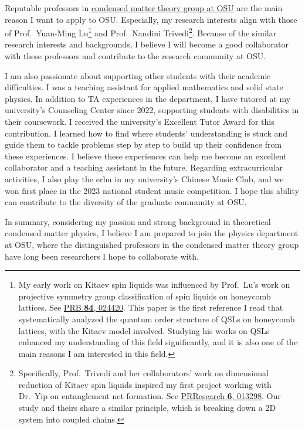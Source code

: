 Reputable professors in \href{https://physics.osu.edu/research/condensed-matter/condensed-matter-theory}{condensed matter theory group at OSU} are the main reason I want to apply to OSU. Especially, my research interests align with those of Prof.~Yuan-Ming Lu\footnote{My early work on Kitaev spin liquids was influenced by Prof.~Lu's work on projective symmetry group classification of spin liquids on honeycomb lattices. See \href{https://journals.aps.org/prb/abstract/10.1103/PhysRevB.84.024420}{PRB \textbf{84}, 024420}. This paper is the first reference I read that systematically analyzed the quantum order structure of QSLs on honeycomb lattices, with the Kitaev model involved. Studying his works on QSLs enhanced my understanding of this field significantly, and it is also one of the main reasons I am interested in this field.} and Prof.~Nandini Trivedi\footnote{Specifically, Prof.~Trivedi and her collaborators' work on dimensional reduction of Kitaev spin liquids inspired my first project working with Dr.~Yip on entanglement net formation. See \href{https://doi.org/10.1103/PhysRevResearch.6.013298}{PRResearch \textbf{6}, 013298}. Our study and theirs share a similar principle, which is breaking down a 2D system into coupled chains.}. Because of the similar research interests and backgrounds, I believe I will become a good collaborator with these professors and contribute to the research community at OSU.    

I am also passionate about supporting other students with their academic difficulties. I was a teaching assistant for applied mathematics and solid state physics. In addition to TA experiences in the department, I have tutored at my university's Counseling Center since 2022, supporting students with disabilities in their coursework. I received the university's Excellent Tutor Award for this contribution. I learned how to find where students' understanding is stuck and guide them to tackle problems step by step to build up their confidence from these experiences. I believe these experiences can help me become an excellent collaborator and a teaching assistant in the future. Regarding extracurricular activities, I also play the erhu in my university's Chinese Music Club, and we won first place in the 2023 national student music competition. I hope this ability can contribute to the diversity of the graduate community at OSU.

In summary, considering my passion and strong background in theoretical condensed matter physics, I believe I am prepared to join the physics department at OSU, where the distinguished professors in the condensed matter theory group have long been researchers I hope to collaborate with.
